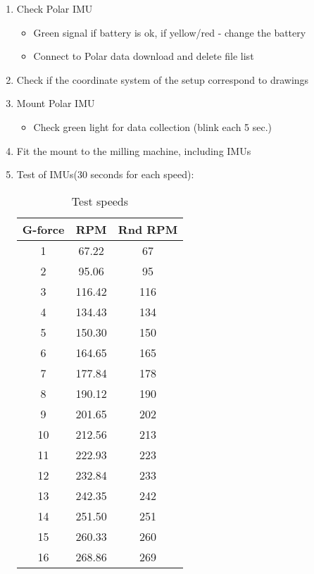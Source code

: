\begin{enumerate}
\setlength\itemsep{0em}
    \item Check Polar IMU
        \begin{itemize}\vspace{-.3cm}
        \setlength\itemsep{0em}
            \item Green signal if battery is ok, if yellow/red - change the battery
            \item Connect to Polar data download and delete file list
        \end{itemize}
    
    \item Check if the coordinate system of the setup correspond to drawings
    \item Mount Polar IMU
        \begin{itemize}\vspace{-.3cm}
        \setlength\itemsep{0em}
            \item Check green light for data collection (blink each 5 sec.)
        \end{itemize}
    \item Fit the mount to the milling machine, including IMUs     
    \item Test of IMUs(30 seconds for each speed):
    
\begin{table}[h]
  \centering
  \caption{Test speeds}
    \begin{tabular}{ccc}
    \textbf{G-force} & \textbf{ RPM} & \textbf{Rnd RPM} \\
    \midrule
    1     & 67.22 & 67 \\
    2     & 95.06 & 95 \\
    3     & 116.42 & 116 \\
    4     & 134.43 & 134 \\
    5     & 150.30 & 150 \\
    6     & 164.65 & 165 \\
    7     & 177.84 & 178 \\
    8     & 190.12 & 190 \\
    9     & 201.65 & 202 \\
    10    & 212.56 & 213 \\
    11    & 222.93 & 223 \\
    12    & 232.84 & 233 \\
    13    & 242.35 & 242 \\
    14    & 251.50 & 251 \\
    15    & 260.33 & 260 \\
    16    & 268.86 & 269 \\
    \bottomrule
    \end{tabular}%
  \label{tab:addlabel}%
\end{table}%



\end{enumerate}
